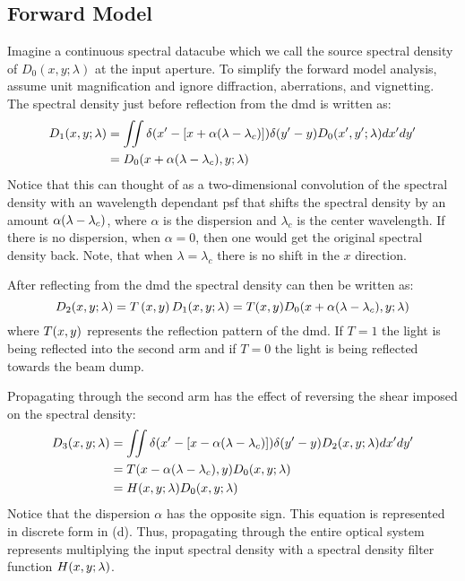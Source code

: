 \subsection{Forward Model}\label{ssec:afssicForwardModel}

Imagine a continuous spectral datacube which we call the source spectral density of $D_0 \left(x, y;\lambda \right)$ at the input aperture. To simplify the forward model analysis, assume unit magnification and ignore diffraction, aberrations, and vignetting. The spectral density just before reflection from the \gls{dmd} is written as:
%
\begin{equation}
\begin{split}
		D_1 \ap{ x, y; \lambda } & = \iint \delta \ap{x^\prime - \left[ x + \alpha \ap{\lambda - \lambda_c} \right] } \delta \ap{y^\prime - y } D_0 \ap{x^\prime, y^\prime; \lambda} dx^\prime dy^\prime \\
		& = D_0 \ap{x + \alpha \ap{\lambda - \lambda_c}, y; \lambda}
\end{split}
\end{equation}
%
Notice that this can thought of as a two-dimensional convolution of the spectral density with an wavelength dependant \acrfull{psf} that shifts the spectral density by an amount $\alpha \ap{\lambda - \lambda_c}$, where $\alpha$ is the dispersion and $\lambda_c$ is the center wavelength. If there is no dispersion, when $\alpha = 0$, then one would get the original spectral density back. Note, that when $\lambda = \lambda_c$ there is no shift in the $x$ direction. 

After reflecting from the \gls{dmd} the spectral density can then be written as:
%
\begin{equation}
D_2 \ap{ x, y; \lambda } = T\left( x, y \right) D_1\ap{ x, y; \lambda} = T \ap{ x, y } D_0 \ap{x + \alpha \ap{\lambda - \lambda_c}, y; \lambda}
\end{equation}
%
where $T \ap{ x, y }$ represents the reflection pattern of the \gls{dmd}. If $T = 1$ the light is being reflected into the second arm and if $T = 0$ the light is being reflected towards the beam dump. 

Propagating through the second arm has the effect of reversing the shear imposed on the spectral density:
%
\begin{equation}
\begin{split}
	D_3 \ap{x,y;\lambda} & = \iint  \delta \ap{x^\prime - \left[ x - \alpha \ap{\lambda - \lambda_c} \right]} \delta \ap{y^\prime - y} D_2 \ap{x,y;\lambda} dx^\prime dy^\prime \\
	& = T \ap{x - \alpha\ap{\lambda - \lambda_c},y} D_0 \ap{x,y;\lambda} \\
	& = H \ap{x,y;\lambda} D_0 \ap{x,y;\lambda}
	\label{eq:afssicFilter}
\end{split}
\end{equation}
%
Notice that the dispersion $\alpha$ has the opposite sign. This equation is represented in discrete form in (d). Thus, propagating through the entire optical system represents multiplying the input spectral density with a spectral density filter function $H \ap{x,y;\lambda}$. 

